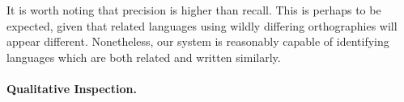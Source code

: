 

It is worth noting that precision is higher than recall.  This is perhaps to be expected, given that related languages using wildly differing orthographies will appear different.  Nonetheless, our system is reasonably capable of identifying languages which are both related and written similarly.


\paragraph{Qualitative Inspection.}
